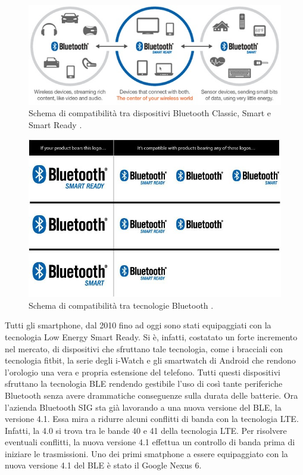 \begin{figure}[t]
	\centering
	\includegraphics[width=0.9\linewidth, keepaspectratio]{Images/bt/bt_01}
	\caption[Schema di compatibilità Bluetooth.]{Schema di compatibilità tra dispositivi Bluetooth Classic, Smart e Smart Ready \cite{BT-Brand}.}
	\label{fig:bt_01}
\end{figure}

\begin{figure}[t]
	\centering
	\includegraphics[width=0.9\linewidth, keepaspectratio]{Images/bt/bt_02}
	\caption[Compatibilità tecnologie Bluetooth]{Schema di compatibilità tra tecnologie Bluetooth \cite{BT-2012-tabellacomparativa}.}
	\label{fig:bt_02}
\end{figure}

Tutti gli smartphone, dal 2010 fino ad oggi sono stati equipaggiati con la tecnologia Low Energy Smart Ready. Si è, infatti, costatato un forte incremento nel mercato, di dispositivi che sfruttano tale tecnologia, come i bracciali con tecnologia fitbit, la serie degli i-Watch e gli smartwatch di Android che rendono l'orologio una vera e propria estensione del telefono. Tutti questi dispositivi sfruttano la tecnologia \acs{BLE} rendendo gestibile l'uso di così tante periferiche Bluetooth senza avere drammatiche conseguenze sulla durata delle batterie. Ora l'azienda Bluetooth SIG sta già lavorando a una nuova versione del \acs{BLE}, la versione 4.1. Essa mira a ridurre alcuni conflitti di banda con la tecnologia \acf{LTE}. Infatti, la 4.0 si trova tra le bande 40 e 41 della tecnologia \acs{LTE}. Per risolvere eventuali conflitti, la nuova versione 4.1 effettua un controllo di banda prima di iniziare le trasmissioni. Uno dei primi smatphone a essere equipaggiato con la nuova versione 4.1 del \acs{BLE} è stato il Google Nexus 6.
\bigskip

